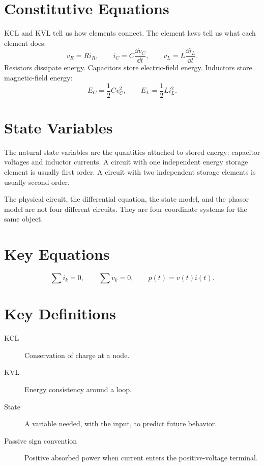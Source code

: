 \section{Constitutive Equations}
KCL and KVL tell us how elements connect. The element laws tell us what each
element does:
\[
v_R=Ri_R,\qquad i_C=C\frac{\dd v_C}{\dd t},\qquad
v_L=L\frac{\dd i_L}{\dd t}.
\]
Resistors dissipate energy. Capacitors store electric-field energy. Inductors
store magnetic-field energy:
\[
E_C=\frac{1}{2}Cv_C^2,\qquad
E_L=\frac{1}{2}Li_L^2.
\]

\section{State Variables}
The natural state variables are the quantities attached to stored energy:
capacitor voltages and inductor currents. A circuit with one independent energy
storage element is usually first order. A circuit with two independent storage
elements is usually second order.

\begin{physicalbox}
The physical circuit, the differential equation, the state model, and the phasor
model are not four different circuits. They are four coordinate systems for the
same object.
\end{physicalbox}

\section{Key Equations}
\[
\sum i_k=0,\qquad \sum v_k=0,\qquad
p(t)=v(t)i(t).
\]

\section{Key Definitions}
\begin{description}
\item[KCL] Conservation of charge at a node.
\item[KVL] Energy consistency around a loop.
\item[State] A variable needed, with the input, to predict future behavior.
\item[Passive sign convention] Positive absorbed power when current enters the
positive-voltage terminal.
\end{description}
